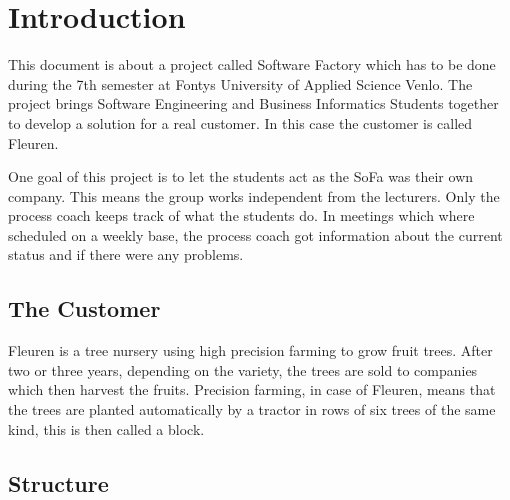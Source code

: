 \section{Introduction}
This document is about a project called Software Factory which has to be done during the 7th semester at Fontys University of Applied Science Venlo. The project brings Software Engineering and Business Informatics Students together to develop a solution for a real customer. In this case the customer is called Fleuren. 

One goal of this project is to let the students act as the SoFa was their own company. This means the group works independent from the lecturers. Only the process coach keeps track of what the students do. In meetings which where scheduled on a weekly base, the process coach got information about the current status and if there were any problems. 

\subsection{The Customer}
Fleuren is a tree nursery using high precision farming to grow fruit trees. After two or three years, depending on the variety, the trees are sold to companies which then harvest the fruits. Precision farming, in case of Fleuren, means that the trees are planted automatically by a tractor in rows of six trees of the same kind, this is then called a block.

\subsection{Structure}

